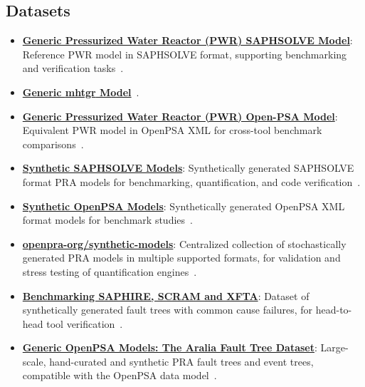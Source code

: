 \subsection{Datasets}
\begin{itemize}
    \item \textbf{\href{https://doi.org/10.5281/zenodo.13996959}{Generic Pressurized Water Reactor (PWR) SAPHSOLVE Model}}: Reference PWR model in SAPHSOLVE format, supporting benchmarking and verification tasks~\cite{aras_generic_2024}.

    \item \textbf{\href{https://doi.org/10.5281/zenodo.14070453}{Generic \acrfull{mhtgr} Model}}~\cite{ hamza_openpra-orggeneric-mhtgr-model_2025}.
    
   
    
    \item \textbf{\href{https://doi.org/10.5281/zenodo.14070453}{Generic Pressurized Water Reactor (PWR) Open-PSA Model}}: Equivalent PWR model in OpenPSA XML for cross-tool benchmark comparisons~\cite{aras_generic_2024-1}.

    \item \textbf{\href{https://doi.org/10.5281/zenodo.13996735}{Synthetic SAPHSOLVE Models}}: Synthetically generated SAPHSOLVE format PRA models for benchmarking, quantification, and code verification~\cite{aras_synthetic_2024}.
    
    \item \textbf{\href{https://doi.org/10.5281/zenodo.13996370}{Synthetic OpenPSA Models}}: Synthetically generated OpenPSA XML format models for benchmark studies~\cite{aras_synthetic_2024-1}.
    
    \item \textbf{\href{https://doi.org/10.5281/zenodo.15320670}{openpra-org/synthetic-models}}: Centralized collection of stochastically generated PRA models in multiple supported formats, for validation and stress testing of quantification engines~\cite{aras_synthetic_2025}.
    
    \item \textbf{\href{https://doi.org/10.5281/zenodo.7706615}{Benchmarking SAPHIRE, SCRAM and XFTA}}: Dataset of synthetically generated fault trees with common cause failures, for head-to-head tool verification~\cite{earthperson_dataset_2023}.
    
    \item \textbf{\href{https://doi.org/10.5281/zenodo.15293416}{Generic OpenPSA Models: The Aralia Fault Tree Dataset}}: Large-scale, hand-curated and synthetic PRA fault trees and event trees, compatible with the OpenPSA data model~\cite{earthperson_generic_2021}.
\end{itemize}